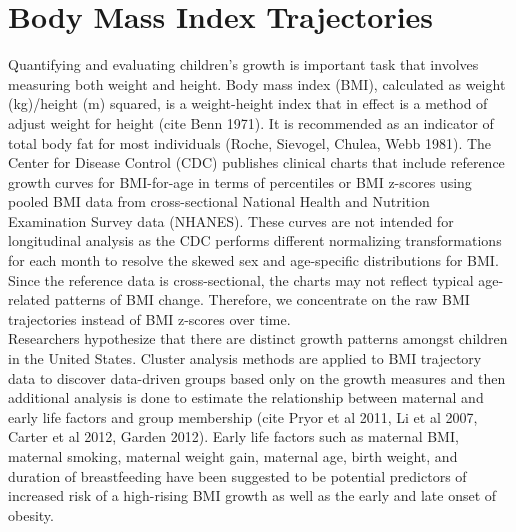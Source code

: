 \section{Body Mass Index Trajectories}
Quantifying and evaluating children's growth is important task that involves measuring both weight and height. Body mass index (BMI), calculated as weight (kg)/height (m) squared, is a weight-height index that in effect is a method of adjust weight for height (cite Benn 1971). It is recommended as an indicator of total body fat for most individuals (Roche, Sievogel, Chulea, Webb 1981). The Center for Disease Control (CDC) publishes clinical charts that include reference growth curves for BMI-for-age in terms of percentiles or BMI z-scores using pooled BMI data from cross-sectional National Health and Nutrition Examination Survey data (NHANES). These curves are not intended for longitudinal analysis as the CDC performs different normalizing transformations for each month to resolve the skewed sex and age-specific distributions for BMI. Since the reference data is cross-sectional, the charts may not reflect typical age-related patterns of BMI change. Therefore, we concentrate on the raw BMI trajectories instead of BMI z-scores over time.\\ 

Researchers hypothesize that there are distinct growth patterns amongst children in the United States. Cluster analysis methods are applied to BMI trajectory data to discover data-driven groups based only on the growth measures and then additional analysis is done to estimate the relationship between maternal and early life factors and group membership (cite Pryor et al 2011, Li et al 2007, Carter et al 2012, Garden 2012).  Early life factors such as maternal BMI, maternal smoking, maternal weight gain, maternal age, birth weight, and duration of breastfeeding have been suggested to be potential predictors of increased risk of a high-rising BMI growth as well as the early and late onset of obesity.

